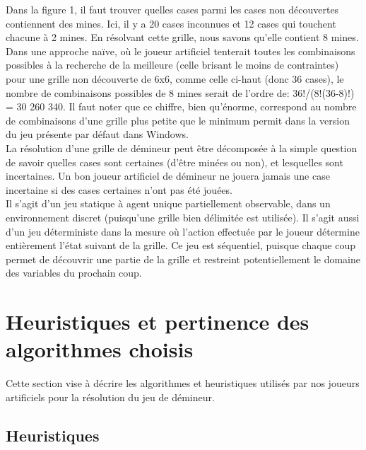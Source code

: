 \documentclass{article}
\begin{document}
Dans la figure 1, il faut trouver quelles cases parmi les cases non découvertes contiennent des mines. Ici, il y a 
20 cases inconnues et 12 cases qui touchent chacune à 2 mines. En résolvant cette grille, 
nous savons qu’elle contient 8 mines. Dans une approche naïve, où le joueur artificiel 
tenterait toutes les combinaisons possibles à la recherche de la meilleure 
(celle brisant le moins de contraintes) pour une grille non découverte de 6x6, 
comme celle ci-haut (donc 36 cases), le nombre de combinaisons possibles de 8 mines serait de l’ordre de:
36!/(8!(36-8)!) = 30 260 340. 
Il faut noter que ce chiffre, bien qu’énorme, correspond au nombre de combinaisons d’une grille 
plus petite que le minimum permit dans la version du jeu présente par défaut dans Windows. \\

La résolution d’une grille de démineur peut être décomposée à la simple question de savoir quelles 
cases sont certaines (d’être minées ou non), et lesquelles sont incertaines. Un bon joueur 
artificiel de démineur ne jouera jamais une case incertaine si des cases certaines 
n’ont pas été jouées. \\

Il s’agit d’un jeu statique à agent unique partiellement observable, dans un environnement 
discret (puisqu’une grille bien délimitée est utilisée). Il s’agit aussi d’un jeu 
déterministe dans la mesure où l’action effectuée par le joueur détermine entièrement 
l’état suivant de la grille. Ce jeu est séquentiel, puisque chaque coup permet de 
découvrir une partie de la grille et restreint potentiellement le domaine des variables du prochain coup.

\section{Heuristiques et pertinence des algorithmes choisis}

Cette section vise à décrire les algorithmes et heuristiques utilisés par nos joueurs artificiels pour
la résolution du jeu de démineur.

\subsection{Heuristiques}
\end{document}
